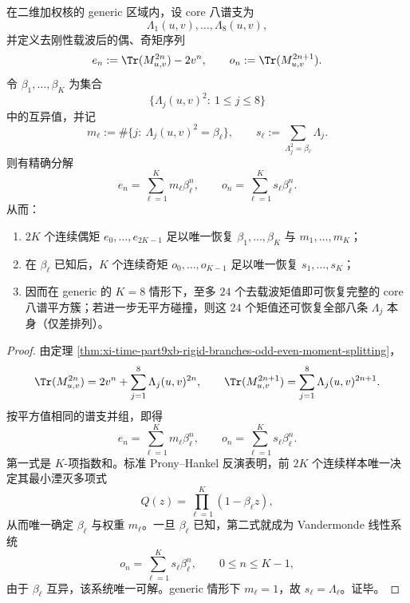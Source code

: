 \begin{theorem}[去刚性载波后的平方谱有限采样定理]\label{thm:conclusion-decoupled-square-spectrum-finite-sampling}
在二维加权核的 generic 区域内，设 core 八谱支为
\[
\Lambda_1(u,v),\dots,\Lambda_8(u,v),
\]
并定义去刚性载波后的偶、奇矩序列
\[
e_n:=\Tr(M_{u,v}^{2n})-2v^n,
\qquad
o_n:=\Tr(M_{u,v}^{2n+1}).
\]
令 \(\beta_1,\dots,\beta_K\) 为集合
\[
\{\Lambda_j(u,v)^2:\ 1\le j\le 8\}
\]
中的互异值，并记
\[
m_\ell:=\#\{j:\ \Lambda_j(u,v)^2=\beta_\ell\},
\qquad
s_\ell:=\sum_{\Lambda_j^2=\beta_\ell}\Lambda_j.
\]
则有精确分解
\[
e_n=\sum_{\ell=1}^{K}m_\ell\beta_\ell^n,
\qquad
o_n=\sum_{\ell=1}^{K}s_\ell\beta_\ell^n.
\]
从而：
\begin{enumerate}
\normalfont
  \item \(2K\) 个连续偶矩 \(e_0,\dots,e_{2K-1}\) 足以唯一恢复 \(\beta_1,\dots,\beta_K\) 与 \(m_1,\dots,m_K\)；
  \item 在 \(\beta_\ell\) 已知后，\(K\) 个连续奇矩 \(o_0,\dots,o_{K-1}\) 足以唯一恢复 \(s_1,\dots,s_K\)；
  \item 因而在 generic 的 \(K=8\) 情形下，至多 \(24\) 个去载波矩值即可恢复完整的 core 八谱平方簇；若进一步无平方碰撞，则这 \(24\) 个矩值还可恢复全部八条 \(\Lambda_j\) 本身（仅差排列）。
\end{enumerate}
\end{theorem}
\begin{proof}
由定理 \ref{thm:xi-time-part9xb-rigid-branches-odd-even-moment-splitting}，
\[
\Tr(M_{u,v}^{2n})=2v^n+\sum_{j=1}^{8}\Lambda_j(u,v)^{2n},
\qquad
\Tr(M_{u,v}^{2n+1})=\sum_{j=1}^{8}\Lambda_j(u,v)^{2n+1}.
\]
按平方值相同的谱支并组，即得
\[
e_n=\sum_{\ell=1}^{K}m_\ell\beta_\ell^n,
\qquad
o_n=\sum_{\ell=1}^{K}s_\ell\beta_\ell^n.
\]
第一式是 \(K\)-项指数和。标准 Prony--Hankel 反演表明，前 \(2K\) 个连续样本唯一决定其最小湮灭多项式
\[
Q(z)=\prod_{\ell=1}^{K}(1-\beta_\ell z),
\]
从而唯一确定 \(\beta_\ell\) 与权重 \(m_\ell\)。一旦 \(\beta_\ell\) 已知，第二式就成为 Vandermonde 线性系统
\[
o_n=\sum_{\ell=1}^{K}s_\ell\beta_\ell^n,
\qquad 0\le n\le K-1,
\]
由于 \(\beta_\ell\) 互异，该系统唯一可解。generic 情形下 \(m_\ell=1\)，故 \(s_\ell=\Lambda_\ell\)。证毕。
\end{proof}

